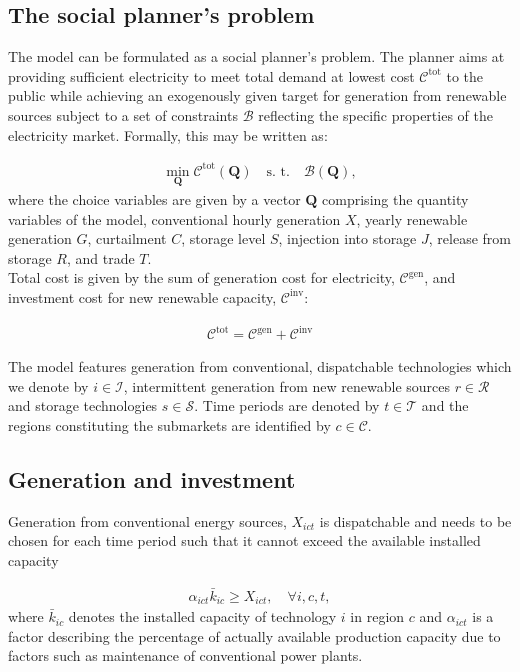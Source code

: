 \documentclass[authoryear]{elsarticle}
\begin{document}
\subsection{The social planner's problem}

The model can be formulated as a social planner's problem. The planner aims at providing sufficient electricity to meet total demand at lowest cost $\mathcal{C}^{\mathrm{tot}}$ to the public while achieving an exogenously given target for generation from renewable sources subject to a set of constraints $\mathcal{B}$ reflecting the specific properties of the electricity market. Formally, this may be written as:

\begin{align}
\min_{\mathbf{Q}} \mathcal{C}^{\mathrm{tot}}(\mathbf{Q}) \quad \text{s. t.} \quad \mathcal{B}(\mathbf{Q}), \label{eq:social_planner}
\end{align}
where the choice variables are given by a vector $\mathbf{Q}$ comprising the quantity variables of the model, conventional hourly generation $X$, yearly renewable generation $G$, curtailment $C$, storage level $S$, injection into storage $J$, release from storage $R$, and trade $T$.\\
Total cost is given by the sum of generation cost for electricity, $\mathcal{C}^\mathrm{gen}$, and investment cost for new renewable capacity, $\mathcal{C}^\mathrm{inv}$: 

\begin{align}
\mathcal{C}^{\mathrm{tot}} = \mathcal{C}^\mathrm{gen} + \mathcal{C}^\mathrm{inv} \label{eq:total_cost}
\end{align}

The model features generation from conventional, dispatchable technologies which we denote by $i \in \mathcal{I}$, intermittent generation from new renewable sources $r \in \mathcal{R}$ and storage technologies $s \in \mathcal{S}$. Time periods are denoted by $t \in \mathcal{T}$ and the regions constituting the submarkets are identified by $c \in \mathcal{C}$.

\subsection{Generation and investment}

Generation from conventional energy sources, $X_{ict}$ is dispatchable and needs to be chosen for each time period such that it cannot exceed the available installed capacity

\begin{align}
\alpha_{ict} \bar{k}_{ic} \geq X_{ict}, \quad \forall i,c,t, \label{eq:mkt_cap}
\end{align}
where $\bar{k}_{ic}$ denotes the installed capacity of technology $i$ in region $c$ and $\alpha_{ict}$ is a factor describing the percentage of actually available production capacity due to factors such as maintenance of conventional power plants.
\end{document}
